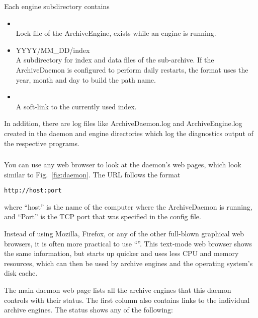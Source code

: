 \noindent Each engine subdirectory contains
\begin{itemize}
\item {}\\
  Lock file of the ArchiveEngine, exists while an engine is running.
\item YYYY/MM\_DD/index \\
  A subdirectory for index and data files of the sub-archive.  If the
  ArchiveDaemon is configured to perform daily restarts, the format
  uses the year, month and day to build the path name.
\item {} \\
  A soft-link to the currently used index.
\end{itemize}

\noindent In addition, there are log files like ArchiveDaemon.log and
ArchiveEngine.log created in the daemon and engine directories which
log the diagnostics output of the respective programs.

\subsubsection{} \label{sec:daemonserver}
You can use any web browser to look at the daemon's web pages,
which look similar to Fig.~\ref{fig:daemon}.
The URL follows the format
\begin{lstlisting}[keywordstyle=\sffamily]
    http://host:port
\end{lstlisting}
\noindent where ``host'' is the name of the computer where the
ArchiveDaemon is running, and ``Port'' is the TCP port that was
specified in the config file.

\NOTE Instead of using Mozilla, Firefox, or any of the other
full-blown graphical web browsers, it is often more practical to use
``''. This text-mode web browser shows the same
information, but starts up quicker and uses less CPU
and memory resources, which can then be used by archive engines and the
operating system's disk cache.

The main daemon web page lists all the archive engines that this
daemon controls with their status. The first column also contains
links to the individual archive engines. The status shows any of the
following:

